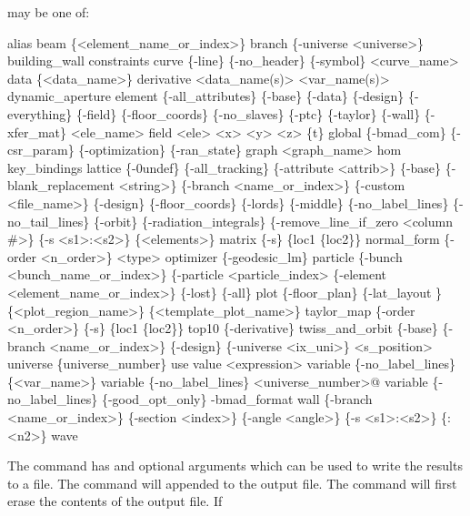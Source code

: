 {{ may be one of:
\begin{example}
  alias
  beam \{<element_name_or_index>\}
  branch \{-universe <universe>\} 
  building_wall  
  constraints
  curve \{-line\} \{-no_header\} \{-symbol\} <curve_name> 
  data \{<data_name>\} 
  derivative <data_name(s)> <var_name(s)>
  dynamic_aperture
  element \{-all_attributes\} \{-base\} \{-data\} \{-design\} \{-everything\} \{-field\} 
        \{-floor_coords\} \{-no_slaves\} \{-ptc\} \{-taylor\} \{-wall\} \{-xfer_mat\} <ele_name>
  field <ele> <x> <y> <z> \{t\}
  global \{-bmad_com\} \{-csr_param\} \{-optimization\} \{-ran_state\} 
  graph <graph_name>
  hom
  key_bindings
  lattice \{-0undef\} \{-all_tracking\} \{-attribute <attrib>\} \{-base\} 
        \{-blank_replacement <string>\} \{-branch <name_or_index>\} 
        \{-custom <file_name>\} \{-design\} \{-floor_coords\} \{-lords\} \{-middle\} 
        \{-no_label_lines\} \{-no_tail_lines\} \{-orbit\} \{-radiation_integrals\} 
        \{-remove_line_if_zero <column \#>\} \{-s <s1>:<s2>\} \{<elements>\} 
  matrix \{-s\} \{loc1 \{loc2\}\}
  normal_form \{-order <n_order>\} <type>
  optimizer \{-geodesic_lm\}
  particle \{-bunch <bunch_name_or_index>\} \{-particle <particle_index> 
        \{-element <element_name_or_index>\} \{-lost\} \{-all\}
  plot \{-floor_plan\} \{-lat_layout \} \{<plot_region_name>\} \{<template_plot_name>\} 
  taylor_map \{-order <n_order>\} \{-s\} \{loc1 \{loc2\}\}
  top10 \{-derivative\}
  twiss_and_orbit \{-base\} \{-branch <name_or_index>\} \{-design\} 
        \{-universe <ix_uni>\} <s_position>
  universe \{universe_number\}
  use
  value <expression>
  variable \{-no_label_lines\} \{<var_name>\}
  variable \{-no_label_lines\} <universe_number>@
  variable \{-no_label_lines\} \{-good_opt_only\} -bmad_format
  wall \{-branch <name_or_index>\} \{-section <index>\} \{-angle <angle>\} 
        \{-s <s1>:<s2>\} \{<n1>:<n2>\}
  wave
\end{example}

\vskip 0.2in 

The  command has  and 
optional arguments which can be used to write the results to a file.
The  command will appended to the output file. The
 command will first erase the contents of the output
file. If \vn{global%
digit number is substituted for the \vn{*}. The value of the number
starts at \vn{001} and increases by 1 each time \vn{show -write} is
used.  Example:
\begin{example}
  show -write orb.dat orbit    ! Write orbit data to the file "orb.dat".
\end{example}

}}}
